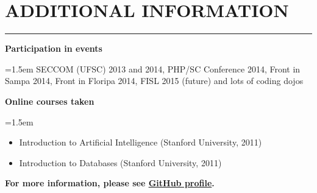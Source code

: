 \documentclass{article}
\newcommand{\additionalentry}[2]{%
	\noindent \textbf{#1} \par
	\noindent \hangindent=1.5em \hangafter=0 \small #2 \par
	\normalsize
	\vspace{0.75em}
}
\newenvironment{main}{%
\noindent
\begin{minipage}[t]{\dimexpr0.75\textwidth-1.5em}%
\let\oldsection\section
\renewcommand{\section}[1]{\oldsection*{\uppercase{##1}}\vspace{-0.5em}\hrule\vspace{1em}}
}{%
\let\section\oldsection
\end{minipage}%
}
\begin{document}
\begin{main}
\section{Additional Information}
\additionalentry{Participation in events}{SECCOM (UFSC) 2013 and 2014, PHP/SC Conference 2014, Front in Sampa 2014, Front in Floripa 2014, FISL 2015 (future) and lots of coding dojos}

\additionalentry{Online courses taken}{\begin{itemize}
\item{Introduction to Artificial Intelligence (Stanford University, 2011)}
\item{Introduction to Databases (Stanford University, 2011)}
\end{itemize}}

\textbf{For more information, please see \href{https://github.com/ranisalt}{GitHub profile}.}


\end{main}%
\end{document}
